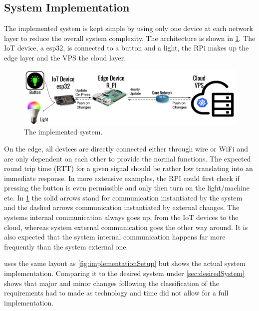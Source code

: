 \subsection{System Implementation}
The implemented system is kept simple by using only one device at each network layer to reduce the overall system complexity. The architecture is shown in \cref{fig:actualSetup}. The IoT device, a esp32, is connected to a button and a light, the RPi makes up the edge layer and the VPS the cloud layer.
\begin{figure}
    \centering
    \includegraphics[width=\textwidth]{figures/actualSetup.png}
    \caption{The implemented system.}
    \label{fig:actualSetup}
\end{figure}
On the edge, all devices are directly connected either through wire or WiFi and are only dependent on each other to provide the normal functions. The expected round trip time (RTT) for a given signal should be rather low translating into an immediate response. In more extensive examples, the RPI could first check if pressing the button is even permissible and only then turn on the light/machine etc. In \cref{fig:actualSetup} the solid arrows stand for communication instantiated by the system and the dashed arrows communication instantiated by external changes. The systems internal communication always goes up, from the IoT devices to the cloud, whereas system external communication goes the other way around. It is also expected that the system internal communication happens far more frequently than the system external one.

 uses the same layout as \cref{fig:implementationSetup} but shows the actual system implementation. Comparing it to the desired system under \cref{sec:desiredSystem} shows that major and minor changes following the classification of the requirements had to made as technology and time did not allow for a full implementation.

